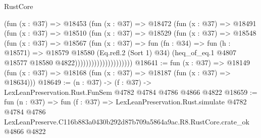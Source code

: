 \begin{lexlean}{RustCore}
\begin{coremodule}
                            (fun (x : @37) =>
                            @18453
                              (fun (x : @37) =>
                              @18472
                                (fun (x : @37) =>
                                @18491
                                  (fun (x : @37) =>
                                  @18510
                                    (fun (x : @37) =>
                                    @18529
                                      (fun (x : @37) =>
                                      @18548
                                        (fun (x : @37) =>
                                        @18567
                                          (fun (x : @37) =>
                                          fun (fn : @34) =>
                                          fun (h : @18571) =>
                                          @18579
                                            @18580
                                            (Eq.refl.{2} (Sort 1) @34)
                                            (heq_of_eq.{1}
                                              @4807
                                              @18577
                                              @18580
                                              @4822)))))))))))))))))))))
@18641 := fun (x : @37) =>
  @18149 (fun (x : @37) => @18168 (fun (x : @37) => @18187 (fun (x : @37) => @18634)))
@18649 := (n : @37) -> (f : @37) -> LexLeanPreservation.Rust.FunSem @4782 @4784 @4786 @4866 @4822
@18659 := fun (n : @37) =>
  fun (f : @37) =>
  LexLeanPreservation.Rust.simulate
    @4782
    @4784
    @4786
    LexLeanPreserve.C116b883a0430b292d87b709a5864a9ac.R8.RustCore.crate_ok
    @4866
    @4822
\end{coremodule}
\end{lexlean}
